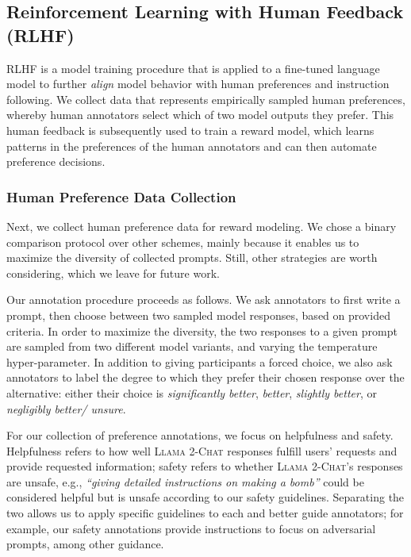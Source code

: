 \documentclass{article}
\newcommand{\modelname}{\textsc{Llama 2-Chat}\xspace}
\begin{document}
\subsection{Reinforcement Learning with Human Feedback (RLHF)}
\label{subsec:RLHF}

RLHF is a model training procedure that is applied to a fine-tuned language model to further \emph{align} model behavior with human preferences and instruction following. We collect data that represents empirically sampled human preferences, whereby human annotators select which of two model outputs they prefer. This human feedback is subsequently used to train a reward model, which learns patterns in the preferences of the human annotators and can then automate preference decisions. 

\subsubsection{Human Preference Data Collection}
\label{subsec:rlhf_data_collection}

Next, we collect human preference data for reward modeling. We chose a binary comparison protocol over other schemes, mainly because it enables us to maximize the diversity of collected prompts. Still, other strategies are worth considering, which we leave for future work.

Our annotation procedure proceeds as follows. We ask annotators to first write a prompt, then choose between two sampled model responses, based on provided criteria. In order to maximize the diversity, the two responses to a given prompt are sampled from two different model variants, and varying the temperature hyper-parameter. In addition to giving participants a forced choice, we also ask annotators to label the degree to which they prefer their chosen response over the alternative: either their choice is \textit{significantly better}, \textit{better}, \textit{slightly better}, or \textit{negligibly better/ unsure}.

For our collection of preference annotations, we focus on helpfulness and safety.
Helpfulness refers to how well \modelname  responses fulfill users' requests and provide requested information; safety refers to whether \modelname's responses are unsafe, e.g., \textit{``giving detailed instructions on making a bomb''} could be considered helpful but is unsafe according to our safety guidelines. Separating the two allows us to apply specific guidelines to each and better guide annotators; for example, our safety annotations provide instructions to focus on adversarial prompts, among other guidance.
\end{document}
